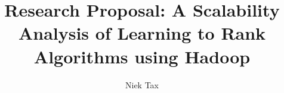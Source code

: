 \documentclass{sig-alternate}
\begin{document}
%
\conferenceinfo{}{}

\title{Research Proposal: A Scalability Analysis of Learning to Rank Algorithms using Hadoop}
%
%
%
%
%

%
\author{
%
%
\alignauthor
Niek Tax\\
       \\
       \\
       \\
}
\end{document}
